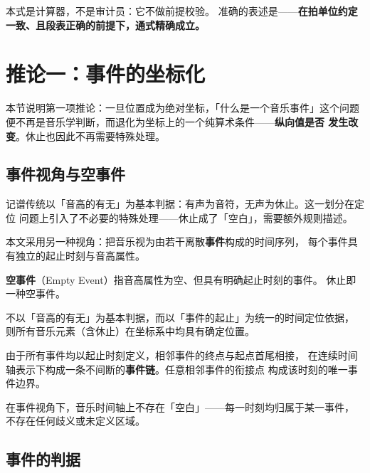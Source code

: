 \documentclass[11pt,a4paper,fontset=none]{ctexart}
\begin{document}
\begin{注记}
本式是计算器，不是审计员：它不做前提校验。
准确的表述是——\textbf{在拍单位约定一致、且段表正确的前提下，通式精确成立。}
\end{注记}

\section{推论一：事件的坐标化}
\label{sec:event}

本节说明第一项推论：一旦位置成为绝对坐标，「什么是一个音乐事件」这个问题
便不再是音乐学判断，而退化为坐标上的一个纯算术条件——\textbf{纵向值是否
发生改变}。休止也因此不再需要特殊处理。
\subsection{事件视角与空事件}

记谱传统以「音高的有无」为基本判据：有声为音符，无声为休止。这一划分在定位
问题上引入了不必要的特殊处理——休止成了「空白」，需要额外规则描述。

本文采用另一种视角：把音乐视为由若干离散\textbf{事件}构成的时间序列，
每个事件具有独立的起止时刻与音高属性。

\begin{定义}[空事件]
\textbf{空事件}（Empty Event）指音高属性为空、但具有明确起止时刻的事件。
休止即一种空事件。
\end{定义}

\begin{观察}
不以「音高的有无」为基本判据，而以「事件的起止」为统一的时间定位依据，
则所有音乐元素（含休止）在坐标系中均具有确定位置。
\end{观察}

由于所有事件均以起止时刻定义，相邻事件的终点与起点首尾相接，
在连续时间轴表示下构成一条不间断的\textbf{事件链}。任意相邻事件的衔接点
构成该时刻的唯一事件边界。

\begin{观察}
在事件视角下，音乐时间轴上不存在「空白」——每一时刻均归属于某一事件，
不存在任何歧义或未定义区域。
\end{观察}

\subsection{事件的判据}
\end{document}
